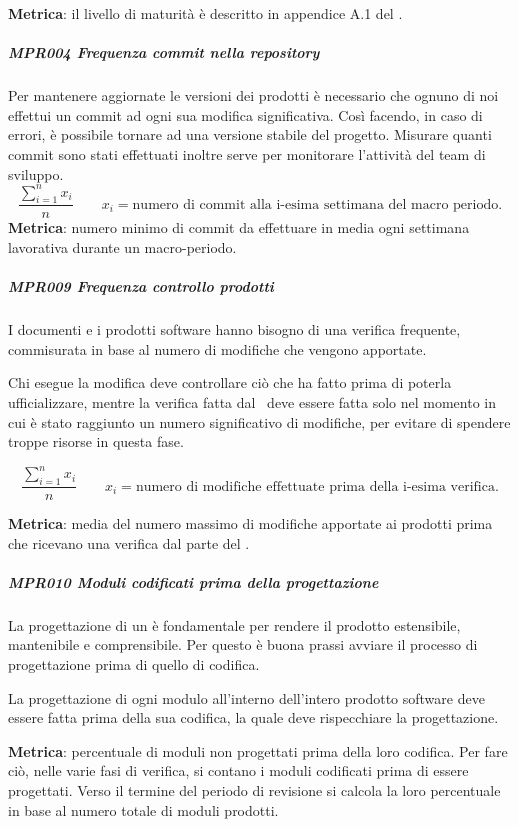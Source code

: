 	        \textbf{Metrica}: il livello di maturità è descritto in appendice A.1 del \PdQd.

			\subparagraph{MPR004 Frequenza commit nella repository}
			Per mantenere aggiornate le versioni dei prodotti è necessario che ognuno di noi effettui un commit ad ogni sua modifica significativa.
			Così facendo, in caso di errori, è possibile tornare ad una versione stabile del progetto.
			Misurare quanti commit sono stati effettuati inoltre serve per monitorare l'attività del team di sviluppo.
			\[\dfrac{\sum_{i=1}^{n} x_i}{n} \qquad x_i=\text{numero di commit alla i-esima settimana del macro periodo.}\]
			\textbf{Metrica}: numero minimo di commit da effettuare in media ogni settimana lavorativa durante un macro-periodo.


			\subparagraph{MPR009 Frequenza controllo prodotti}
			I documenti e i prodotti software hanno bisogno di una verifica frequente, commisurata in base al numero di modifiche che vengono apportate.

			Chi esegue la modifica deve controllare ciò che ha fatto prima di poterla ufficializzare, mentre la verifica fatta dal \Ver\ deve essere
			fatta solo nel momento in cui è stato raggiunto un numero significativo di modifiche, per evitare di spendere troppe risorse in questa fase.

			\[\dfrac{\sum_{i=1}^{n} x_i}{n} \qquad x_i=\text{numero di modifiche effettuate prima della i-esima verifica.}\]

			\textbf{Metrica}: media del numero massimo di modifiche apportate ai prodotti prima che ricevano una verifica dal parte del \Ver.

            \subparagraph{MPR010 Moduli codificati prima della progettazione}
            La progettazione di un  è fondamentale per rendere il prodotto estensibile, mantenibile e comprensibile. Per questo è buona prassi avviare il processo di progettazione prima di quello di codifica.

            La progettazione di ogni modulo all'interno dell'intero prodotto software deve essere fatta prima della sua codifica, la quale deve rispecchiare la progettazione.

            \textbf{Metrica}: percentuale di moduli non progettati prima della loro codifica. Per fare ciò, nelle varie fasi di verifica, si contano i moduli codificati prima di essere progettati. Verso il termine del periodo di revisione si calcola la loro percentuale in base al numero totale di moduli prodotti.


